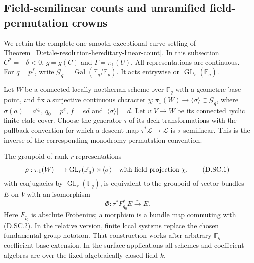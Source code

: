 \subsection{Field-semilinear counts and unramified field-permutation crowns}

We retain the complete one-smooth-exceptional-curve setting of
Theorem~\ref{D:etale-resolution-hereditary-linear-count}. In this
subsection $C^2=-\delta<0$, $g=g(C)$ and $\Gamma=\pi_1(U)$.
All representations are continuous. For $q=p^f$, write
$\mathcal G_q=\operatorname{Gal}(\mathbb F_q/\mathbb F_p)$.
It acts entrywise on $\operatorname{GL}_r(\mathbb F_q)$.

\begin{lemma}
\label{D:twisted-deck-Frobenius-semilinear-model}
Let $W$ be a connected locally noetherian scheme over $\mathbb F_q$
with a geometric base point, and fix a
surjective continuous character
$\chi:\pi_1(W)\to\langle\sigma\rangle\subset\mathcal G_q$,
where $\sigma(a)=a^{q_0}$, $q_0=p^e$, $f=ed$ and
$|\langle\sigma\rangle|=d$. Let $v:V\to W$ be its connected
cyclic finite etale cover. Choose the generator $\tau$ of its
deck transformations with the pullback convention for which a
descent map $\tau^*\mathcal L\to\mathcal L$ is
$\sigma$-semilinear. This is the inverse of the corresponding
monodromy permutation convention.

The groupoid of rank-$r$ representations
\[
 \rho:\pi_1(W)\longrightarrow
      \operatorname{GL}_r(\mathbb F_q)\rtimes\langle\sigma\rangle
 \quad\hbox{with field projection }\chi,
                                                        \tag{D.SC.1}
\]
with conjugacies by $\operatorname{GL}_r(\mathbb F_q)$, is
equivalent to the groupoid of vector bundles $E$ on $V$ with
an isomorphism
\[
             \Phi:\tau^*F_{q_0}^*E\xrightarrow{\sim}E.  \tag{D.SC.2}
\]
Here $F_{q_0}$ is absolute Frobenius; a morphism is a bundle
map commuting with (D.SC.2). In the relative version, finite
local systems replace the chosen fundamental-group notation.
That construction works after arbitrary $\mathbb F_q$-coefficient-base
extension. In the surface applications all schemes and coefficient
algebras are over the fixed algebraically closed field $k$.
\end{lemma}

